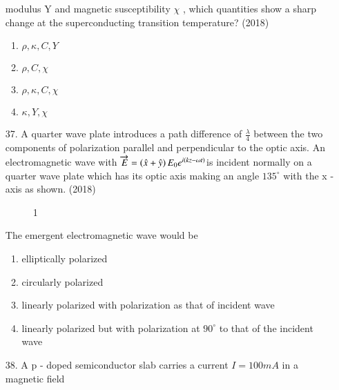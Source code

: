 \documentclass[journal]{IEEEtran}
\begin{document}
\begin{enumerate}
    modulus Y  and magnetic susceptibility $\chi$ , which quantities show a sharp change at
    the superconducting transition temperature?  \hfill (2018)
    \begin{enumerate} [label = (\Alph*)]
     \item $\rho, \kappa, C,Y$ 
     \item $\rho,C,\chi$
     \item $\rho, \kappa, C,\chi$
     \item $\kappa,Y,\chi$ 
    \end{enumerate}
    \item[37.] A quarter wave plate introduces a path difference of $\frac{\lambda}{4}$ between the two components
    of polarization parallel and perpendicular to the optic axis. An electromagnetic wave with $\overrightarrow{E}=\left(\hat{x}+\hat{y}\right)E_0e^{i\left(kz-\omega t\right)}$is incident normally on a quarter wave plate which has its optic axis
    making an angle $135^{\circ}$ with the x - axis as shown.  \hfill (2018)
    \begin{figure}[!ht]
        \centering
        \caption{1}
    \end{figure}
    The emergent electromagnetic wave would be 
    \begin{enumerate}[label=(\Alph*)]
        \item elliptically polarized 
        \item circularly polarized 
        \item  linearly polarized with polarization as that of incident wave 
        \item  linearly polarized but with polarization at $90^{\circ}$ to that of the incident wave 
    \end{enumerate}
    \item[38.]  A p - doped semiconductor slab carries a current $I=100mA$ in a magnetic field

\end{enumerate}
\end{document}
